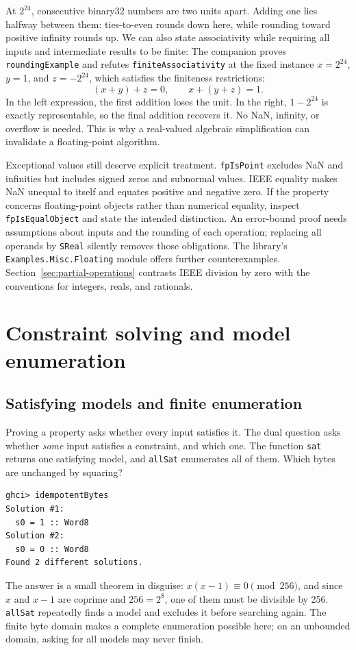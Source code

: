 \documentclass[review]{jfp-epi}
\newcommand{\code}[1]{\texttt{#1}}
\begin{document}
At $2^{24}$, consecutive binary32 numbers are two units apart. Adding one lies
halfway between them: ties-to-even rounds down here, while rounding toward
positive infinity rounds up. We can also state associativity while requiring
all inputs and intermediate results to be finite:
The companion proves \code{roundingExample} and refutes
\code{finiteAssociativity} at the fixed instance
$x=2^{24}$, $y=1$, and $z=-2^{24}$, which satisfies the finiteness restrictions:
\[
 (x+y)+z=0, \qquad x+(y+z)=1.
\]
In the left expression, the first addition loses the unit. In the right,
$1-2^{24}$ is exactly representable, so the final addition recovers it.
No NaN, infinity, or overflow is needed. This is why a real-valued algebraic
simplification can invalidate a floating-point algorithm.

Exceptional values still deserve explicit treatment. \code{fpIsPoint} excludes
NaN and infinities but includes signed zeros and subnormal values. IEEE equality
makes NaN unequal to itself and equates positive and negative zero. If the
property concerns floating-point objects rather than numerical equality, inspect
\code{fpIsEqualObject} and state the intended distinction. An error-bound proof
needs assumptions about inputs and the rounding of each operation; replacing
all operands by \code{SReal} silently removes those obligations. The library's
\code{Examples.Misc.Floating} module offers further counterexamples.
Section~\ref{sec:partial-operations} contrasts IEEE division by zero with
the conventions for integers, reals, and rationals.


\section{Constraint solving and model enumeration}
\label{sec:finding}

\subsection{Satisfying models and finite enumeration}

Proving a property asks whether every input satisfies it. The dual question asks
whether \emph{some} input satisfies a constraint, and which one. The function
\code{sat} returns one satisfying model, and \code{allSat} enumerates all of them.
Which bytes are unchanged by squaring?
\begin{lstlisting}[style=output]
ghci> idempotentBytes
Solution #1:
  s0 = 1 :: Word8
Solution #2:
  s0 = 0 :: Word8
Found 2 different solutions.
\end{lstlisting}
The answer is a small theorem in disguise: $x(x-1)\equiv 0 \pmod{256}$, and since
$x$ and $x-1$ are coprime and $256=2^8$, one of them must be divisible by 256.
\code{allSat} repeatedly finds a model and excludes it before searching again.
The finite byte domain makes a complete enumeration possible here; on an
unbounded domain, asking for all models may never finish.
\end{document}
